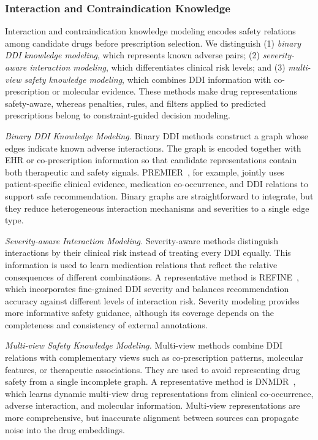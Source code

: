 \documentclass[manuscript,review]{acmart}
\begin{document}
\subsubsection{Interaction and Contraindication Knowledge}

Interaction and contraindication knowledge modeling encodes safety relations among candidate drugs before prescription selection. We distinguish (1) \textit{binary DDI knowledge modeling}, which represents known adverse pairs; (2) \textit{severity-aware interaction modeling}, which differentiates clinical risk levels; and (3) \textit{multi-view safety knowledge modeling}, which combines DDI information with co-prescription or molecular evidence. These methods make drug representations safety-aware, whereas penalties, rules, and filters applied to predicted prescriptions belong to constraint-guided decision modeling.

\textit{Binary DDI Knowledge Modeling.} Binary DDI methods construct a graph whose edges indicate known adverse interactions. The graph is encoded together with EHR or co-prescription information so that candidate representations contain both therapeutic and safety signals. PREMIER~\cite{bhoi2021premier}, for example, jointly uses patient-specific clinical evidence, medication co-occurrence, and DDI relations to support safe recommendation. Binary graphs are straightforward to integrate, but they reduce heterogeneous interaction mechanisms and severities to a single edge type.

\textit{Severity-aware Interaction Modeling.} Severity-aware methods distinguish interactions by their clinical risk instead of treating every DDI equally. This information is used to learn medication relations that reflect the relative consequences of different combinations. A representative method is REFINE~\cite{bhoi2023refine}, which incorporates fine-grained DDI severity and balances recommendation accuracy against different levels of interaction risk. Severity modeling provides more informative safety guidance, although its coverage depends on the completeness and consistency of external annotations.

\textit{Multi-view Safety Knowledge Modeling.} Multi-view methods combine DDI relations with complementary views such as co-prescription patterns, molecular features, or therapeutic associations. They are used to avoid representing drug safety from a single incomplete graph. A representative method is DNMDR~\cite{liuDNMDRDynamicNetworks2025c}, which learns dynamic multi-view drug representations from clinical co-occurrence, adverse interaction, and molecular information. Multi-view representations are more comprehensive, but inaccurate alignment between sources can propagate noise into the drug embeddings.
\end{document}
